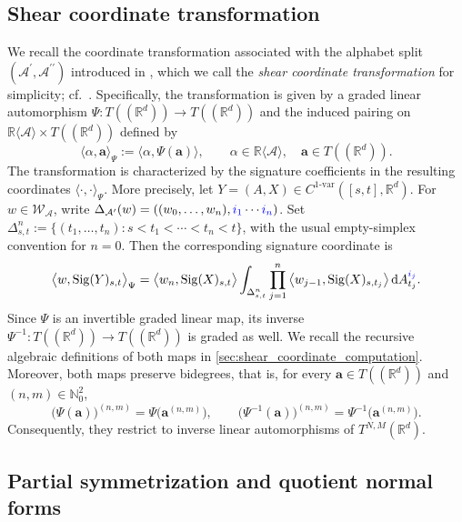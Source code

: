 \documentclass{amsart}
\theoremstyle{definition}
\theoremstyle{remark}
\newcommand{\dd}{\mathrm{d}}
\newcommand{\Sig}[1]{\mathrm{Sig}(#1)}
\newcommand{\decomp}[1]{\Delta_{#1}}
\newcommand{\blue}[1]{{\color{blue}#1}}
\begin{document}
\subsection{Shear coordinate transformation}
\label{sec:shear_coordinate_transformation}

We recall the coordinate transformation associated with the alphabet split
$(\mathcal{A}^{\prime},\mathcal{A}^{\prime\prime})$ introduced in
\cite{mainpaper}, which we call the \emph{shear coordinate transformation}
for simplicity; cf.~\cite[Remark~3.3]{mainpaper}. Specifically, the
transformation is given by a graded linear automorphism
$\Psi:T((\mathbb{R}^d))\to T((\mathbb{R}^d))$ and the induced pairing on
$\mathbb{R}\langle\mathcal{A}\rangle\times T((\mathbb{R}^d))$ defined by
\[
    \langle \alpha,\mathbf{a}\rangle_{\Psi}
    :=
    \langle \alpha,\Psi(\mathbf{a})\rangle,
    \qquad
    \alpha\in\mathbb{R}\langle\mathcal{A}\rangle,
    \quad
    \mathbf{a}\in T((\mathbb{R}^d)).
\]
The transformation is characterized by the signature coefficients in the
resulting coordinates
$\langle\cdot,\cdot\rangle_{\Psi}$. More precisely, let
$Y=(A,X)\in C^{1\text{-var}}([s,t],\mathbb{R}^{d})$. For
$w\in\mathcal{W}_{\mathcal{A}}$, write
$\decomp{\mathcal{A}^{\prime}}(w)
    =
    \left(
        (w_0,\ldots,w_n),
        \blue{i_1}\cdots\blue{i_n}
    \right)$.
Set $\Delta^n_{s,t}:=\{(t_1,\ldots,t_n):s<t_1<\cdots<t_n<t\}$, with the
usual empty-simplex convention for $n=0$.
Then the corresponding signature coordinate is
\[
    \big\langle w,\Sig{Y}_{s,t}\big\rangle_{\Psi}
    =
    \big\langle w_n,\Sig{X}_{s,t}\big\rangle
    \int_{\Delta^n_{s,t}}
    \prod_{j=1}^{n}
    \big\langle w_{j-1},\Sig{X}_{s,t_j}\big\rangle
    \,\dd A_{t_j}^{\blue{i_j}}.
\]
Since $\Psi$ is an invertible graded linear map, its inverse
$\Psi^{-1}:T((\mathbb{R}^d))\to T((\mathbb{R}^d))$ is graded as well. We
recall the recursive algebraic definitions of both maps in
\cref{sec:shear_coordinate_computation}. Moreover, both maps preserve
bidegrees, that is, for every
$\mathbf{a}\in T((\mathbb{R}^d))$ and $(n,m)\in\mathbb{N}_0^2$,
\[
    \bigl(\Psi(\mathbf{a})\bigr)^{(n,m)}
    =
    \Psi\bigl(\mathbf{a}^{(n,m)}\bigr),
    \qquad
    \bigl(\Psi^{-1}(\mathbf{a})\bigr)^{(n,m)}
    =
    \Psi^{-1}\bigl(\mathbf{a}^{(n,m)}\bigr).
\]
Consequently, they restrict to inverse linear automorphisms of
$T^{N,M}(\mathbb{R}^d)$.

\subsection{Partial symmetrization and quotient normal forms}
\label{sec:partial_symmetrization}
\end{document}
